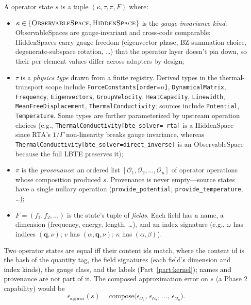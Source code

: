 \documentclass[11pt,a4paper]{article}
\begin{document}
A operator state $s$ is a tuple $(\kappa, \tau, \pi, F)$ where:
\begin{itemize}[leftmargin=2em]
  \item $\kappa \in \{\textsc{ObservableSpace}, \textsc{HiddenSpace}\}$ is the
        \emph{gauge-invariance kind}: ObservableSpaces are gauge-invariant and cross-code
        comparable; HiddenSpaces carry gauge freedom (eigenvector phase, BZ-summation
        choice, degenerate-subspace rotation, …) that the operator layer doesn't pin down,
        so their per-element values differ across adapters by design;
  \item $\tau$ is a \emph{physics type} drawn from a finite registry. Derived types in
        the thermal-transport scope include \texttt{ForceConstants[order=$n$]},
        \texttt{DynamicalMatrix}, \texttt{Frequency}, \texttt{Eigenvectors},
        \texttt{GroupVelocity}, \texttt{HeatCapacity}, \texttt{Linewidth},
        \texttt{MeanFreeDisplacement}, \texttt{ThermalConductivity}; sources include
        \texttt{Potential}, \texttt{Temperature}. Some types are further parameterized
        by upstream operation choices (e.g., \texttt{ThermalConductivity[bte\_solver=
        rta]} is a HiddenSpace since RTA's $1/\Gamma$ non-linearity breaks gauge
        invariance, whereas \texttt{ThermalConductivity[bte\_solver=direct\_inverse]}
        is an ObservableSpace because the full LBTE preserves it);
  \item $\pi$ is the \emph{provenance}: an ordered list $[\mathcal{O}_1, \mathcal{O}_2,
        \ldots, \mathcal{O}_n]$ of operator operations whose composition produced $s$.
        Provenance is never empty---source states have a single nullary operation
        (\texttt{provide\_potential}, \texttt{provide\_temperature}, \ldots);
  \item $F = (f_1, f_2, \ldots)$ is the state's tuple of \emph{fields}. Each field has
        a name, a dimension (frequency, energy, length, …), and an index signature
        (e.g., $\omega$ has indices $(\mathbf{q}, \nu)$; $v$ has $(\alpha, \mathbf{q},
        \nu)$; $\kappa$ has $(\alpha, \beta)$).
\end{itemize}
Two operator states are equal iff their content ids match, where the content id is
the hash of the quantity tag, the field signatures (each field's dimension and
index kinds), the gauge class, and the labels (Part~\ref{part:kernel}); names and
provenance are not part of it. The composed approximation error
on $s$ (a Phase 2 capability) would be
\begin{equation}
  \epsilon_{\text{approx}}(s) = \mathrm{compose}\bigl(\epsilon_{\mathcal{O}_1},\, \epsilon_{\mathcal{O}_2},\, \ldots,\, \epsilon_{\mathcal{O}_n}\bigr).
\end{equation}
\end{document}
